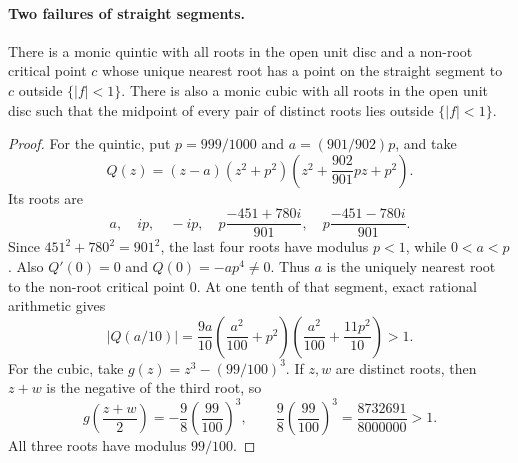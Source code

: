 \paragraph{Two failures of straight segments.}
\begin{proposition}
\label{res:straight-no-go}
There is a monic quintic with all roots in the open unit disc and a non-root
critical point $c$ whose unique nearest root has a point on the straight segment
to $c$ outside $\{|f|<1\}$.  There is also a monic cubic with all roots in the
open unit disc such that the midpoint of every pair of distinct roots lies
outside $\{|f|<1\}$.
\end{proposition}
\begin{proof}
For the quintic, put $p=999/1000$ and $a=(901/902)p$, and take
\[
 Q(z)=(z-a)(z^2+p^2)
       \left(z^2+\frac{902}{901}pz+p^2\right).
\]
Its roots are
\[
 a,\quad ip,\quad-ip,\quad
 p\frac{-451+780i}{901},\quad p\frac{-451-780i}{901}.
\]
Since $451^2+780^2=901^2$, the last four roots have modulus $p<1$,
while $0<a<p$. Also $Q'(0)=0$ and $Q(0)=-ap^4\ne0$. Thus $a$ is
the uniquely nearest root to the non-root critical point $0$.
At one tenth of that segment, exact rational arithmetic gives
\[
 |Q(a/10)|=
 \frac{9a}{10}\left(\frac{a^2}{100}+p^2\right)
 \left(\frac{a^2}{100}+\frac{11p^2}{10}\right)>1.
\]
For the cubic, take $g(z)=z^3-(99/100)^3$. If $z,w$ are distinct roots,
then $z+w$ is the negative of the third root, so
\[
 g\!\left(\frac{z+w}{2}\right)
 =-\frac98\left(\frac{99}{100}\right)^3,
 \qquad \frac98\left(\frac{99}{100}\right)^3
 =\frac{8732691}{8000000}>1.
\]
All three roots have modulus $99/100$.
\end{proof}

